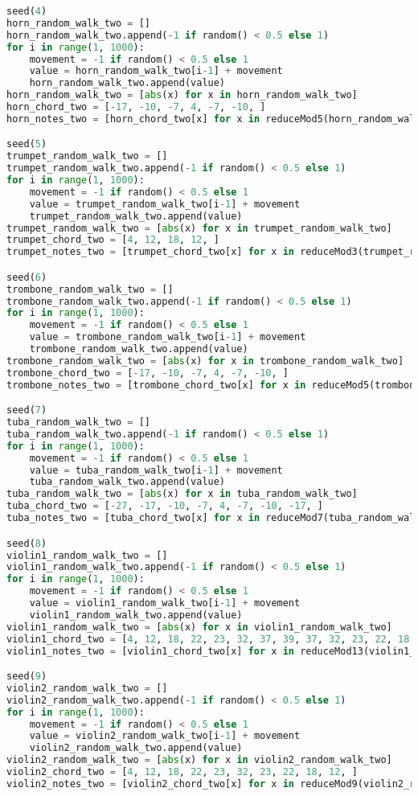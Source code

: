\begin{lstlisting}[language=Python, caption=Tianshu Segment\_IV]
seed(4)
horn_random_walk_two = []
horn_random_walk_two.append(-1 if random() < 0.5 else 1)
for i in range(1, 1000):
    movement = -1 if random() < 0.5 else 1
    value = horn_random_walk_two[i-1] + movement
    horn_random_walk_two.append(value)
horn_random_walk_two = [abs(x) for x in horn_random_walk_two]
horn_chord_two = [-17, -10, -7, 4, -7, -10, ]
horn_notes_two = [horn_chord_two[x] for x in reduceMod5(horn_random_walk_two)]

seed(5)
trumpet_random_walk_two = []
trumpet_random_walk_two.append(-1 if random() < 0.5 else 1)
for i in range(1, 1000):
    movement = -1 if random() < 0.5 else 1
    value = trumpet_random_walk_two[i-1] + movement
    trumpet_random_walk_two.append(value)
trumpet_random_walk_two = [abs(x) for x in trumpet_random_walk_two]
trumpet_chord_two = [4, 12, 18, 12, ]
trumpet_notes_two = [trumpet_chord_two[x] for x in reduceMod3(trumpet_random_walk_two)]

seed(6)
trombone_random_walk_two = []
trombone_random_walk_two.append(-1 if random() < 0.5 else 1)
for i in range(1, 1000):
    movement = -1 if random() < 0.5 else 1
    value = trombone_random_walk_two[i-1] + movement
    trombone_random_walk_two.append(value)
trombone_random_walk_two = [abs(x) for x in trombone_random_walk_two]
trombone_chord_two = [-17, -10, -7, 4, -7, -10, ]
trombone_notes_two = [trombone_chord_two[x] for x in reduceMod5(trombone_random_walk_two)]

seed(7)
tuba_random_walk_two = []
tuba_random_walk_two.append(-1 if random() < 0.5 else 1)
for i in range(1, 1000):
    movement = -1 if random() < 0.5 else 1
    value = tuba_random_walk_two[i-1] + movement
    tuba_random_walk_two.append(value)
tuba_random_walk_two = [abs(x) for x in tuba_random_walk_two]
tuba_chord_two = [-27, -17, -10, -7, 4, -7, -10, -17, ]
tuba_notes_two = [tuba_chord_two[x] for x in reduceMod7(tuba_random_walk_two)]

seed(8)
violin1_random_walk_two = []
violin1_random_walk_two.append(-1 if random() < 0.5 else 1)
for i in range(1, 1000):
    movement = -1 if random() < 0.5 else 1
    value = violin1_random_walk_two[i-1] + movement
    violin1_random_walk_two.append(value)
violin1_random_walk_two = [abs(x) for x in violin1_random_walk_two]
violin1_chord_two = [4, 12, 18, 22, 23, 32, 37, 39, 37, 32, 23, 22, 18, 12, ]
violin1_notes_two = [violin1_chord_two[x] for x in reduceMod13(violin1_random_walk_two)]

seed(9)
violin2_random_walk_two = []
violin2_random_walk_two.append(-1 if random() < 0.5 else 1)
for i in range(1, 1000):
    movement = -1 if random() < 0.5 else 1
    value = violin2_random_walk_two[i-1] + movement
    violin2_random_walk_two.append(value)
violin2_random_walk_two = [abs(x) for x in violin2_random_walk_two]
violin2_chord_two = [4, 12, 18, 22, 23, 32, 23, 22, 18, 12, ]
violin2_notes_two = [violin2_chord_two[x] for x in reduceMod9(violin2_random_walk_two)]


\end{lstlisting}
